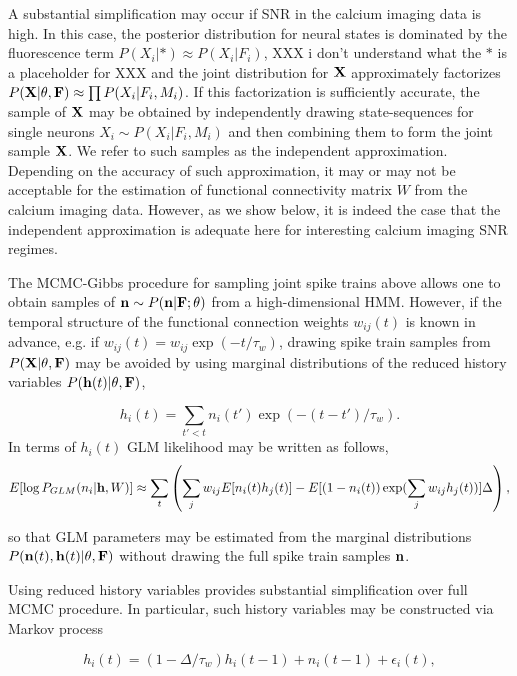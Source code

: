 A substantial simplification may occur if SNR in the calcium imaging data is high. In this case, the posterior distribution for neural states is dominated by the fluorescence term $P(X_i|*)\approx P(X_i|F_i)$, XXX i don't understand what the $\ast$ is a placeholder for XXX and the joint distribution for ${\bf X}$ approximately factorizes $P({\bf X}|\mathbf{\theta}, {\bf F})\approx\prod P(X_i|F_i, M_i)$. If this factorization is sufficiently accurate, the sample of ${\bf X}$ may be obtained by independently drawing state-sequences for single neurons $X_i \sim P(X_i|F_i, M_i)$ and then combining them to form the joint sample ${\bf X}$.  We refer to such samples as the independent approximation. Depending on the accuracy of such approximation, it may or may not be acceptable for the estimation of functional connectivity matrix $W$ from the calcium imaging data. However, as we show below, it is indeed the case that the independent approximation is adequate here for interesting calcium imaging SNR regimes.

The MCMC-Gibbs procedure for sampling joint spike trains above allows one to obtain samples of ${\bf n}\sim P({\bf n}|{\bf F}; \mathbf{\theta})$ from a high-dimensional HMM. However, if the temporal structure of the functional connection weights $w_{ij}(t)$ is known in advance, e.g. if $w_{ij}(t)=w_{ij}\exp(-t/\tau_w)$, drawing spike train samples from $P({\bf X}|\mathbf{\theta}, {\bf F})$ may be avoided by using marginal distributions of the reduced history variables $P({\bf h}(t)|\mathbf{\theta}, {\bf F})$, 

\begin{equation}
h_i(t)=\sum\limits_{t'<t} n_i(t')\exp(-(t-t')/\tau_w).
\end{equation}
In terms of $h_i(t)$ GLM likelihood may be written as follows, 
\begin{equation}
E[\log P_{GLM}(n_i|{\bf h}, W)]\approx \sum_t \left(\sum\limits_{j} w_{ij} E[n_i(t) h_j(t)] -
E[(1-n_i(t)) \exp(\sum\limits_j w_{ij}h_j(t))] \Delta \right), 
\end{equation}

so that GLM parameters may be estimated from the marginal distributions $P({\bf n}(t), {\bf h}(t)|\mathbf{\theta}, {\bf F})$ without drawing the full spike train samples ${\bf n}$.

Using reduced history variables provides substantial simplification over full MCMC procedure. In particular, such history variables may be constructed via Markov process

\begin{equation}\label{eqn:spkhist:definition}
h_i(t)=(1-\Delta/\tau_w) h_i(t-1) + n_i(t-1) + \epsilon_i(t), 
\end{equation}

